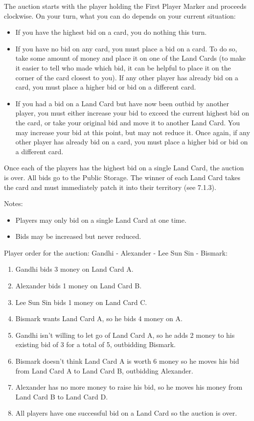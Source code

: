 \documentclass[10pt,twocolumn]{article}
\begin{document}
The auction starts with the player holding the First Player Marker and proceeds clockwise. On your turn, what you can do depends on your current situation:
\begin{itemize}
\item If you have the highest bid on a card, you do nothing this turn.
\item If you have no bid on any card, you must place a bid on a card. To do so, take some amount of money and place it on one of the Land Cards (to make it easier to tell who made which bid, it can be helpful to place it on the corner of the card closest to you). If any other player has already bid on a card, you must place a higher bid or bid on a different card.
\item If you had a bid on a Land Card but have now been outbid by another player, you must either increase your bid to exceed the current highest bid on the card, or take your original bid and move it to another Land Card. You may increase your bid at this point, but may not reduce it. Once again, if any other player has already bid on a card, you must place a higher bid or bid on a different card.
\end{itemize}
Once each of the players has the highest bid on a single Land Card, the auction is over. All bids go to the Public Storage. The winner of each Land Card takes the card and must immediately patch it into their territory (see 7.1.3).

Notes:
\begin{itemize}
\item Players may only bid on a single Land Card at one time.
\item Bids may be increased but never reduced.
\end{itemize}
\begin{BoxExample}
Player order for the auction: Gandhi - Alexander - Lee Sun Sin - Bismark:
\begin{enumerate}
\item Gandhi bids 3 money on Land Card A.
\item Alexander bids 1 money on Land Card B.
\item Lee Sun Sin bids 1 money on Land Card C.
\item Bismark wants Land Card A, so he bids 4 money on A.
\item Gandhi isn't willing to let go of Land Card A, so he adds 2 money to his existing bid of 3 for a total of 5, outbidding Bismark.
\item Bismark doesn't think Land Card A is worth 6 money so he moves his bid from Land Card A to Land Card B, outbidding Alexander.
\item Alexander has no more money to raise his bid, so he moves his money from Land Card B to Land Card D.
\item All players have one successful bid on a Land Card so the auction is over.
\end{enumerate}
\end{BoxExample}
\end{document}
